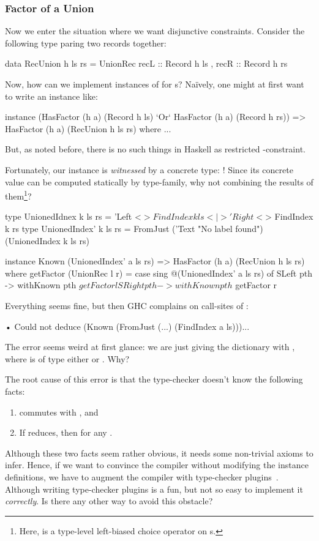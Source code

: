 \documentclass[demotion-paper.tex]{subfiles}
\begin{document}
\subsubsection{Factor of a Union}
Now we enter the situation where we want disjunctive constraints.
Consider the following type paring two records together:
\begin{code}
data RecUnion h ls rs = 
  UnionRec { recL :: Record h ls
           , recR :: Record h rs }
\end{code}
Now, how can we implement instances of  for s?
Na\"{i}vely, one might at first want to write an instance like:
\begin{code}
instance (HasFactor (h a) (Record h ls)
          `Or` HasFactor (h a) (Record h rs))
  => HasFactor (h a) (RecUnion h ls rs) where ...
\end{code}
But, as noted before, there is no such things in Haskell as restricted -constraint.

Fortunately, our  instance is \emph{witnessed} by a concrete type: !
Since its concrete value can be computed statically by  type-family, why not combining the results of them\footnote{Here, \hask{(<|>)} is a type-level left-biased choice operator on s.}?
\begin{code}
type UnionedIdnex k ls rs = 
  'Left <$> FindIndex k ls
  <|> 'Right <$> FindIndex k rs
type UnionedIndex' k ls rs = FromJust 
  ('Text "No label found") (UnionedIndex k ls rs)

instance Known (UnionedIndex' a ls rs)
  => HasFactor (h a) (RecUnion h ls rs) where
  getFactor (UnionRec l r) =
    case sing @(UnionedIndex' a ls rs) of
      SLeft pth -> withKnown pth $ getFactor l
      SRight pth -> withKnown pth $ getFactor r
\end{code}
Everything seems fine, but then GHC complains on call-sites of :
\begin{repl}
• Could not deduce 
  (Known (FromJust (...) (FindIndex a ls)))...
\end{repl}
The error seems weird at first glance: we are just giving the  dictionary with , where  is of type either  or . Why?

The root cause of this error is that the type-checker doesn't know the following facts:
\begin{enumerate}
  \item {} commutes with \haskinline{(<$>)}, and
  \item If  reduces, then  for any .
\end{enumerate}
Although these two facts seem rather obvious, it needs some non-trivial axioms to infer.
Hence, if we want to convince the compiler without modifying the instance definitions, we have to augment the compiler with type-checker plugins~\cite{GHC-Team:2020aa}.
Although writing type-checker plugins is a fun, but not so easy to implement it \emph{correctly}. Is there any other way to avoid this obstacle?
\end{document}
